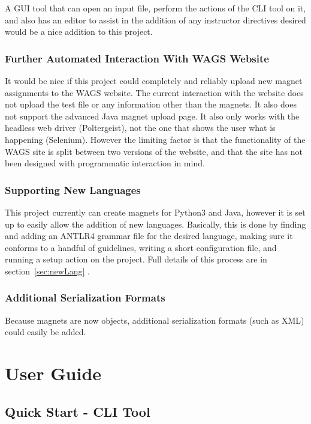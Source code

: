 \documentclass[letter,10pt]{article}
\begin{document}
A GUI tool that can open an input file, perform the actions of the CLI 
tool on it, and also has an editor to assist in the addition of any 
instructor directives desired would be a nice addition to this project.

\subsubsection{Further Automated Interaction With WAGS Website}
It would be nice if this project could completely and reliably upload 
new magnet assignments to the WAGS website. The current interaction 
with the website does not upload the test file or any information other 
than the magnets. It also does not support the advanced Java magnet 
upload page. It also only works with the headless web driver 
(Poltergeist), not the one that shows the user what is happening 
(Selenium). However the limiting factor is that the functionality of 
the WAGS site is split between two versions of the website, and that 
the site has not been designed with programmatic interaction in mind.

\subsubsection{Supporting New Languages}

This project currently can create magnets for Python3 and Java, however 
it is set up to easily allow the addition of new languages. 
Basically, this is done by finding and adding an ANTLR4 grammar file 
for the desired language, making sure it conforms to a handful of 
guidelines, writing a short configuration file, and running a setup 
action on the project. Full details of this process are in 
section~\ref{sec:newLang} .


\subsubsection{Additional Serialization Formats}

Because magnets are now objects, additional serialization formats (such 
as XML) could easily be added. 



\section{User Guide}

\subsection{Quick Start - CLI Tool}
\end{document}
